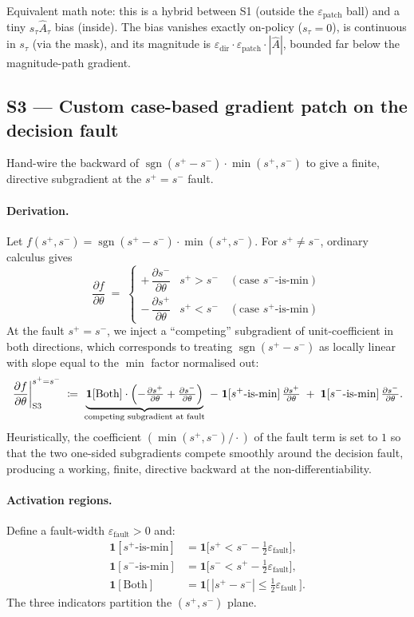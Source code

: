 \documentclass[11pt]{article}
\DeclareMathOperator{\sign}{sgn}
\begin{document}
Equivalent math note: this is a hybrid between S1 (outside the
$\varepsilon_{\text{patch}}$ ball) and a tiny $s_\tau\hat A_\tau$ bias
(inside). The bias vanishes exactly on-policy ($s_\tau = 0$), is
continuous in $s_\tau$ (via the mask), and its magnitude is
$\varepsilon_{\text{dir}}\cdot\varepsilon_{\text{patch}}\cdot|\hat A|$,
bounded far below the magnitude-path gradient.

\subsection{S3 --- Custom case-based gradient patch on the decision fault}
\label{sec:s3}

Hand-wire the backward of $\sign(s^+-s^-)\cdot\min(s^+,s^-)$ to give a
finite, directive subgradient at the $s^+=s^-$ fault.

\paragraph{Derivation.}
Let $f(s^+,s^-) = \sign(s^+-s^-)\cdot\min(s^+,s^-)$. For $s^+\neq s^-$,
ordinary calculus gives
\[
\frac{\partial f}{\partial \theta} \;=\;
\begin{cases}
+\,\dfrac{\partial s^-}{\partial \theta} & s^+ > s^- \quad (\text{case } s^-\text{-is-min}) \\[4pt]
-\,\dfrac{\partial s^+}{\partial \theta} & s^+ < s^- \quad (\text{case } s^+\text{-is-min})
\end{cases}
\]
At the fault $s^+ = s^-$, we inject a ``competing'' subgradient of
unit-coefficient in both directions, which corresponds to treating
$\sign(s^+-s^-)$ as locally linear with slope equal to the $\min$ factor
normalised out:
\[
\left.\frac{\partial f}{\partial \theta}\right|_{\text{S3}}^{s^+=s^-}
 \;\coloneqq\;
 \underbrace{\mathbf 1[\text{Both}]\cdot\Bigl(-\tfrac{\partial s^+}{\partial \theta} + \tfrac{\partial s^-}{\partial \theta}\Bigr)}_{\text{competing subgradient at fault}}
 \;-\; \mathbf 1[s^+\text{-is-min}]\,\tfrac{\partial s^+}{\partial \theta}
 \;+\; \mathbf 1[s^-\text{-is-min}]\,\tfrac{\partial s^-}{\partial \theta}.
\]
Heuristically, the coefficient $(\min(s^+,s^-)/\cdot)$ of the fault term
is set to $1$ so that the two one-sided subgradients compete smoothly
around the decision fault, producing a working, finite, directive
backward at the non-differentiability.

\paragraph{Activation regions.}
Define a fault-width $\varepsilon_{\text{fault}} > 0$ and:
\begin{align*}
\mathbf 1[s^+\text{-is-min}]     &= \mathbf 1\bigl[s^+ < s^- - \tfrac{1}{2}\varepsilon_{\text{fault}}\bigr], \\
\mathbf 1[s^-\text{-is-min}]     &= \mathbf 1\bigl[s^- < s^+ - \tfrac{1}{2}\varepsilon_{\text{fault}}\bigr], \\
\mathbf 1[\text{Both}]           &= \mathbf 1\bigl[\,|s^+ - s^-| \leq \tfrac{1}{2}\varepsilon_{\text{fault}}\,\bigr].
\end{align*}
The three indicators partition the $(s^+, s^-)$ plane.
\end{document}
